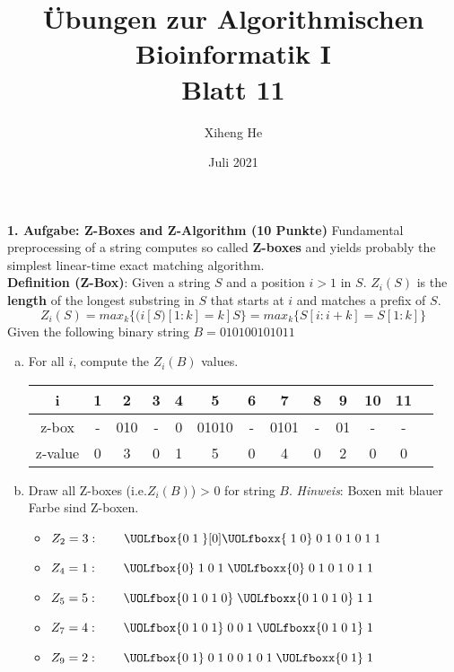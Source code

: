 \documentclass{article}
\title{Übungen zur Algorithmischen Bioinformatik I\\
Blatt 11}
\author{Xiheng He}
\date{Juli 2021}
\begin{document}
\maketitle
\begin{flushleft}
\textbf{1. Aufgabe: Z-Boxes and Z-Algorithm (10 Punkte)}
\newline
Fundamental preprocessing of a string computes so called \textbf{Z-boxes} and yields probably the simplest
linear-time exact matching algorithm.
\newline \\
\textbf{Definition (Z-Box)}: Given a string $S$ and a position $i > 1$ in $S$. $Z_i(S)$ is the \textbf{length} of the longest
substring in $S$ that starts at $i$ and matches a prefix of $S$.
\begin{equation*}
    Z_i(S) = max_k \{(i[S) [1 : k] = k]S \} = max_k \{S[i : i + k] = S[1 : k]\}
\end{equation*}
Given the following binary string $B = 010100101011$
\begin{enumerate}[(a)]
    \item For all $i$, compute the $Z_i(B)$ values.
    \newline \\
    \begin{tabular}{|c||c|c|c|c|c|c|c|c|c|c|c|c|}
        \hline i & 1 & 2 & 3 & 4 & 5 & 6 & 7 & 8 & 9 & 10 & 11 \\
        \hline z-box & - & 010 & - & 0 & 01010 & - & 0101 & - & 01 & - & - \\
        \hline z-value & 0 & 3 & 0 & 1 & 5 & 0 & 4 & 0 & 2 & 0 & 0 \\
        \hline
    \end{tabular}
    \item Draw all Z-boxes (i.e.$Z_i(B)$) > 0 for string $B$.
    \newline
    \emph{Hinweis}: Boxen mit blauer Farbe sind Z-boxen.
    \begin{itemize}
        \item $Z_2 = 3: \qquad \UOLfbox{0\;1\;}[0]\UOLfboxx{\;1\;0} \;0\;1\;0\;1\;0\;1\;1$
        \item $Z_4 = 1: \qquad \UOLfbox{0}\;1\; 0\; 1\; \UOLfboxx{0}\; 0\; 1\; 0\; 1\; 0\; 1\; 1$
        \item $Z_5 = 5: \qquad \UOLfbox{0\;1\; 0\; 1\;0}\;\UOLfboxx{ 0\; 1\; 0\; 1\; 0}\; 1\; 1$
        \item $Z_7 = 4: \qquad \UOLfbox{0\;1\; 0\; 1}\;0\; 0\; 1\;\UOLfboxx{0\; 1\; 0\; 1}\; 1$
        \item $Z_9 = 2: \qquad \UOLfbox{0\;1}\;0\;1\;0\; 0\; 1\;0\; 1\; \UOLfboxx{0\;1}\; 1$

\end{itemize}
\end{enumerate}
\end{flushleft}
\end{document}
